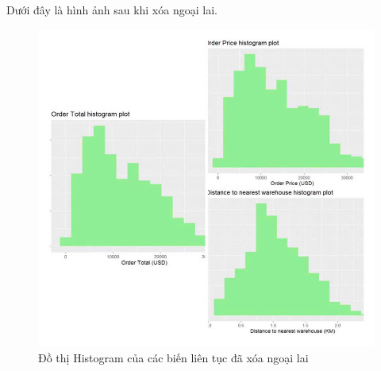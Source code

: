  Dưới đây là hình ảnh sau khi xóa ngoại lai.
 \begin{figure}[H]
    \centering
    \includegraphics[width=0.7\linewidth]{graphics/bang8.jpg}
    \caption{Đồ thị Histogram của các biến liên tục đã xóa ngoại lai}
    
\end{figure}
